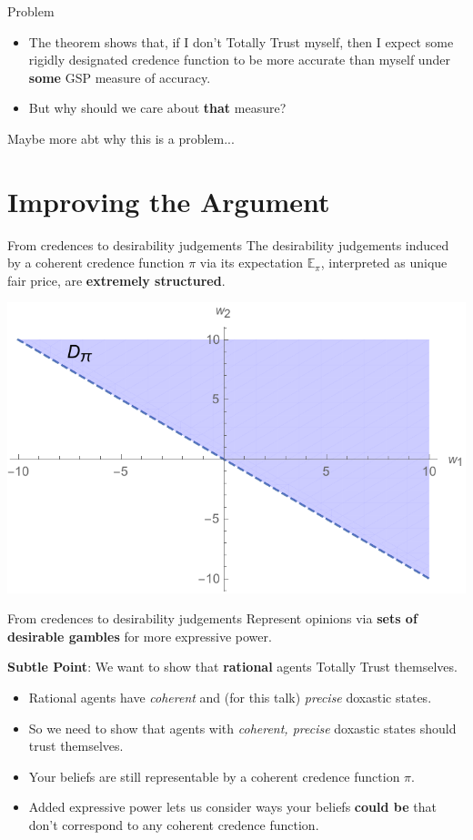 \documentclass[aspectratio=169, dvipsnames]{beamer}
\newcommand{\E}{\mathbb{E}}
\begin{document}
\begin{frame}{Problem}
  \begin{itemize}
  \item The theorem shows that, if I don't Totally Trust myself, then I expect some rigidly designated credence function
    to be more accurate than myself under \alert{\textbf{some}} GSP measure of accuracy.
  \item But why should we care about \alert{\textbf{that}} measure?
  \end{itemize}
\end{frame}

\begin{frame}
  Maybe more abt why this is a problem...
\end{frame}

\section{Improving the Argument}

\begin{frame}{From credences to desirability judgements}
  The desirability judgements induced by a coherent credence function $\pi$ via its expectation $\E_{\pi}$, interpreted as unique
  fair price, are \textbf{extremely structured}.
  \begin{center}
      \includegraphics[width=.7\textwidth]{desirability1.pdf}
  \end{center}
\end{frame}

\begin{frame}{From credences to desirability judgements}
  Represent opinions via \alert{\textbf{sets of desirable gambles}} for more expressive power.

  \textbf{Subtle Point}: We want to show that \alert{\textbf{rational}} agents Totally Trust themselves.
  \begin{itemize}
    \item Rational agents have \textit{coherent} and (for this talk) \textit{precise} doxastic states.
    \item So we need to show that agents with \textit{coherent, precise} doxastic states should trust themselves. 
    \item Your beliefs are still representable by a coherent credence function $\pi$.
    \item Added expressive power lets us consider ways your beliefs \textbf{\alert{could be}}
      that don't correspond to any coherent credence function.
  \end{itemize}
\end{frame}
\end{document}
